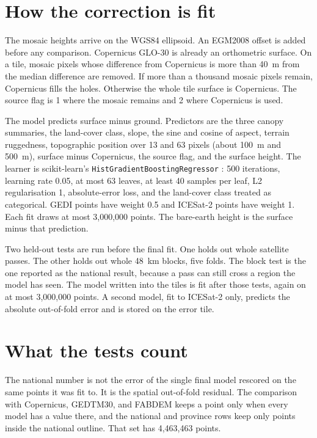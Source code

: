 \documentclass[11pt]{article}
\begin{document}
\section{How the correction is fit}

The mosaic heights arrive on the WGS84 ellipsoid.
An EGM2008 offset is added before any comparison.
Copernicus GLO-30 is already an orthometric surface.
On a tile, mosaic pixels whose difference from Copernicus is more than 40~m from the median difference are removed.
If more than a thousand mosaic pixels remain, Copernicus fills the holes.
Otherwise the whole tile surface is Copernicus.
The source flag is 1 where the mosaic remains and 2 where Copernicus is used.

The model predicts surface minus ground.
Predictors are the three canopy summaries, the land-cover class, slope, the sine and cosine of aspect, terrain ruggedness, topographic position over 13 and 63 pixels (about 100~m and 500~m), surface minus Copernicus, the source flag, and the surface height.
The learner is scikit-learn's \texttt{HistGradientBoostingRegressor} \citep{pedregosa2011sklearn}: 500 iterations, learning rate 0.05, at most 63 leaves, at least 40 samples per leaf, L2 regularisation 1, absolute-error loss, and the land-cover class treated as categorical.
GEDI points have weight 0.5 and ICESat-2 points have weight 1.
Each fit draws at most 3,000,000 points.
The bare-earth height is the surface minus that prediction.

Two held-out tests are run before the final fit.
One holds out whole satellite passes.
The other holds out whole 48~km blocks, five folds.
The block test is the one reported as the national result, because a pass can still cross a region the model has seen.
The model written into the tiles is fit after those tests, again on at most 3,000,000 points.
A second model, fit to ICESat-2 only, predicts the absolute out-of-fold error and is stored on the error tile.

\section{What the tests count}

The national number is not the error of the single final model rescored on the same points it was fit to.
It is the spatial out-of-fold residual.
The comparison with Copernicus, GEDTM30, and FABDEM keeps a point only when every model has a value there, and the national and province rows keep only points inside the national outline.
That set has 4,463,463 points.
\end{document}
